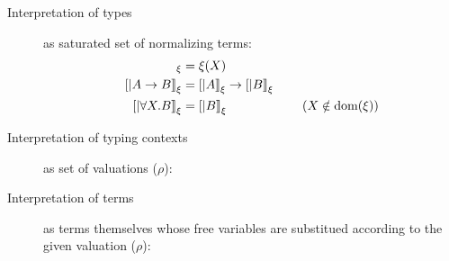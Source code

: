 \begin{description}
\item[Interpretation of types] as saturated set of normalizing terms:
\begin{align*}
[| X |]_\xi           &= \xi(X) \\ 
[| A -> B |]_\xi      &= [|A|]_\xi -> [|B|]_\xi \\
[| \forall X.B |]_\xi &= [|B|]_\xi \qquad\qquad\qquad (X\notin\dom(\xi))
\end{align*}
\item[Interpretation of typing contexts] as set of valuations ($\rho$):

\item[Interpretation of terms] as terms themselves whose free variables are
	substitued according to the given valuation ($\rho$):
\end{description}
